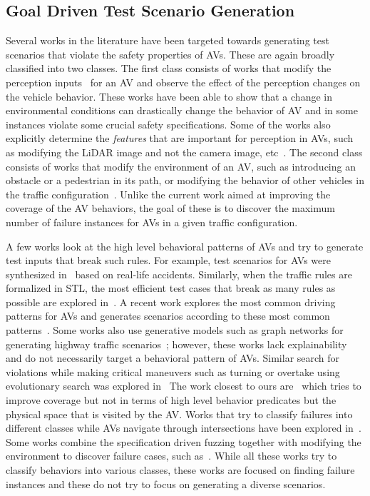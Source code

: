 \subsection{Goal Driven Test Scenario Generation}
Several works in the literature have been targeted towards generating test scenarios that violate the safety properties of AVs.
% 
These are again broadly classified into two classes.
% 
The first class consists of works that modify the perception inputs~\cite{tian2018deeptest,zhang2018deeproad} for an AV and observe the effect of the perception changes on the vehicle behavior.
% 
These works have been able to show that a change in environmental conditions can drastically change the behavior of AV and in some instances violate some crucial safety specifications.
% 
Some of the works also explicitly determine the \emph{features} that are important for perception in AVs, such as modifying the LiDAR image and not the camera image, etc~\cite{abdessalem2018testing}.
% 
The second class consists of works that modify the environment of an AV, such as introducing an obstacle or a pedestrian in its path, or modifying the behavior of other vehicles in the traffic configuration~\cite{Zhong.2021,li2020av}.
% 
Unlike the current work aimed at improving the coverage of the AV behaviors, the goal of these is to discover the maximum number of failure instances for AVs in a given traffic configuration.
% 

A few works look at the high level behavioral patterns of AVs and try to generate test inputs that break such rules.
% 
For example, test scenarios for AVs were synthesized in~\cite{gambi2019generating} based on real-life accidents.
% 
Similarly, when the traffic rules are formalized in STL, the most efficient test cases that break as many rules as possible are explored in~\cite{sun2022lawbreaker}.
% 
A recent work explores the most common driving patterns for AVs and generates scenarios according to these most common patterns~\cite{tian2022generating}.
% 
Some works also use generative models such as graph networks for generating highway traffic scenarios~\cite{Bi.2019}; however, these works lack explainability and do not necessarily target a behavioral pattern of AVs.
% 
Similar search for violations while making critical maneuvers such as turning or overtake using evolutionary search was explored in~\cite{luo2021targeting}
%
The work closest to ours are~\cite{sheikhi2022coverage,hu2021coverage} which tries to improve coverage but not in terms of high level behavior predicates but the physical space that is visited by the AV.
% 
Works that try to classify failures into different classes while AVs navigate through intersections have been explored in~\cite{tang2021systematic}.
% 
Some works combine the specification driven fuzzing together with modifying the environment to discover failure cases, such as~\cite{zhou2023specification,kim2022drivefuzz}.
% 
While all these works try to classify behaviors into various classes, these works are focused on finding failure instances and these do not try to focus on generating a diverse scenarios.
